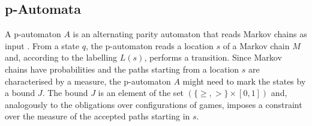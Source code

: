 \documentclass[a4paper,UKenglish]{oasics-v2016}
\begin{document}
\begin{comment}
\end{itemize}
\begin{lemma}{\emph{\cite{CKP15}}}
	For every Markov chain $M$, every location $s$, and every formula $\varphi$ 
	we 
	have $\llbracket\varphi\rrbracket^\rho_M (s)= val_0(s,\varphi)$, where 
	$val_0(s,\varphi)$ is the value of configuration $(s,\varphi)$ in game 
	$G_{M,\varphi}$.
\end{lemma}
For a qualitative $\mu^p$-calculus formula $\varphi$ we say that $M$ satisfies 
$\varphi$, denoted $M, s^{in} \models\varphi$ or $M\models\varphi$, iff 
$\llbracket \varphi\rrbracket^\rho_M(s^{in}) = 1$. That is, $M\models\varphi 
\mbox{ iff }val_{G_{M,\varphi}}(s^{in}, \varphi)=1$.
\end{comment}
%
%
\subsection{p-Automata}
A p-automaton $A$ is an alternating parity automaton that reads Markov chains 
as input \cite{CP13}.
From a state $q$, the p-automaton reads a location $s$ of a Markov chain $M$ 
and, according to the labelling $L(s)$, performs a transition.
Since Markov chains have probabilities and the paths starting from a location 
$s$ are characterised by a measure, the p-automaton $A$ might need to mark the 
states by a bound $J$.
The bound $J$ is an element of the set $(\lbrace \geq,> \rbrace \times [0,1])$ 
and, analogously to the obligations over configurations of games, imposes a 
constraint over the measure of the accepted paths starting in $s$.
\end{document}
